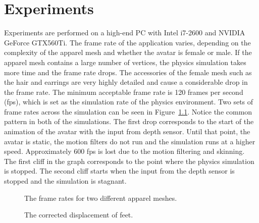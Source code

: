 \chapter{Experiments}
\label{chapter_experiments}
 
Experiments are performed on a high-end PC with Intel i7-2600 and NVIDIA GeForce GTX560Ti. The frame rate of the application varies, depending on the complexity of the apparel mesh and whether the avatar is female or male. If the apparel mesh contains a large number of vertices, the physics simulation takes more time and the frame rate drops. The accessories of the female mesh such as the hair and earrings are very highly detailed and cause a considerable drop in the frame rate. The minimum acceptable frame rate is 120 frames per second (fps), which is set as the simulation rate of the physics environment. Two sets of frame rates across the simulation can be seen in Figure~\ref{fig:fps}. Notice the common pattern in both of the simulations. The first drop corresponds to the start of the animation of the avatar with the input from depth sensor. Until that point, the avatar is static, the motion filters do not run and the simulation runs at a higher speed. Approximately 600 fps is lost due to the motion filtering and skinning. The first cliff in the graph corresponds to the point where the physics simulation is stopped. The second cliff starts when the input from the depth sensor is stopped and the simulation is stagnant.  

\begin{figure}[htbp]
	\begin{center} 
	\end{center}
	\caption{The frame rates for two different apparel meshes.}
	\label{fig:fps}
\end{figure}
 
 
\begin{figure}[htbp]
	\begin{center} 
	\end{center}
	\caption{The corrected displacement of feet.}
	\label{fig:footskating}
\end{figure}


